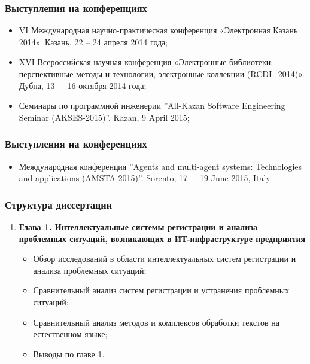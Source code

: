 \documentclass[14pt]{beamer}
\begin{document}
\begin{frame}
\frametitle{Выступления на конференциях}

\begin{itemize}
	\item VI Международная научно-практическая конференция «Электронная Казань 2014». Казань, 22 – 24 апреля 2014 года;
\item XVI Всероссийская научная конференция «Электронные библиотеки: перспективные методы и технологии, электронные коллекции (RCDL--2014)». Дубна, 13 -– 16 октября 2014 года;
\item Семинары по программной инженерии ”All-Kazan Software Engineering Seminar (AKSES-2015)”. Kazan, 9 April 2015;


	
	
\end{itemize}
\end{frame}

\begin{frame}
\frametitle{Выступления на конференциях}

\begin{itemize}
	\item Международная конференция ”Agents and multi-agent systems: Technologies and applications (AMSTA-2015)”. Sorento, 17 –- 19 June 2015, Italy.
	
\end{itemize}
\end{frame}

\begin{frame}
\frametitle{Структура диссертации}
\begin{enumerate}
  \item \textbf{Глава 1. Интеллектуальные системы регистрации и анализа проблемных ситуаций, возникающих в ИТ-инфраструктуре предприятия}
  \begin{itemize}
    \item Обзор исследований в области интеллектуальных систем регистрации и анализа проблемных ситуаций;
    \item Сравнительный анализ систем регистрации и устранения проблемных ситуаций;
    \item Сравнительный анализ методов и комплексов обработки текстов на естественном языке;
    \item Выводы по главе 1.
  \end{itemize}
 \end{enumerate}
\end{frame}
\end{document}
